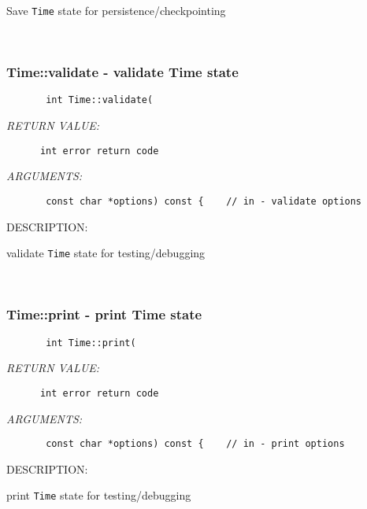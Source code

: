         Save {\tt Time} state for persistence/checkpointing
   
 
\mbox{}\hrulefill\ 
 
\subsubsection [Time::validate] {Time::validate - validate Time state}


  
\begin{verbatim}       int Time::validate(\end{verbatim}{\em RETURN VALUE:}
\begin{verbatim}      int error return code\end{verbatim}{\em ARGUMENTS:}
\begin{verbatim}       const char *options) const {    // in - validate options\end{verbatim}
{\sf DESCRIPTION:\\ }


        validate {\tt Time} state for testing/debugging
   
 
\mbox{}\hrulefill\ 
 
\subsubsection [Time::print] {Time::print - print Time state}


  
\begin{verbatim}       int Time::print(\end{verbatim}{\em RETURN VALUE:}
\begin{verbatim}      int error return code\end{verbatim}{\em ARGUMENTS:}
\begin{verbatim}       const char *options) const {    // in - print options\end{verbatim}
{\sf DESCRIPTION:\\ }


        print {\tt Time} state for testing/debugging
   
 
\mbox{}\hrulefill\ 
 
